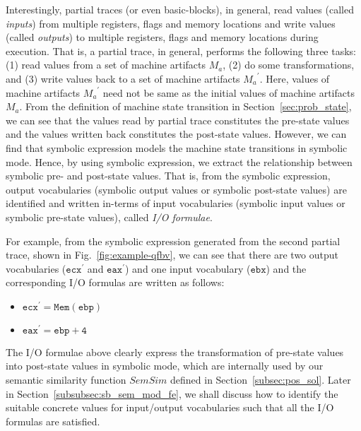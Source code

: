 Interestingly, partial traces (or even basic-blocks), in general, read values (called \emph{inputs}) from multiple registers, flags and memory locations and write values (called \emph{outputs}) to multiple registers, flags and memory locations during execution. That is, a partial trace, in general, performs the following three tasks: (1) read values from a set of machine artifacts $M_a$, (2) do some transformations, and (3) write values back to a set of machine artifacts ${M_a}^\prime$. Here, values of machine artifacts ${M_a}^\prime$ need not be same as the initial values of machine artifacts ${M_a}$. From the definition of machine state transition in Section~\ref{sec:prob_state}, we can see that the values read by partial trace constitutes the pre-state values and the values written back constitutes the post-state values. However,
we can find that symbolic expression models the machine state transitions in symbolic mode.
Hence, by using symbolic expression, we extract the relationship between symbolic pre- and post-state values. That is, from the symbolic expression, output vocabularies (symbolic output values or symbolic post-state values) are identified and written in-terms of input vocabularies (symbolic input values or symbolic pre-state values), called \emph{I/O formulae}.

For example, from the symbolic expression generated from the second partial trace, shown in Fig.~\ref{fig:example-qfbv}, we can see that there are two output vocabularies ($\mathtt{ecx^\prime}$ and $\mathtt{eax^\prime}$) and one input vocabulary ($\mathtt{ebx}$) and the corresponding I/O formulas are written as follows:
\begin{itemize}
\centering
\itemsep-0.1em
 \item[] $\mathtt{ecx^\prime = Mem(ebp)}$
  \item[] $\mathtt{eax^\prime = ebp + 4} $
\end{itemize}
The I/O formulae above clearly express the transformation of pre-state values into post-state values in symbolic mode, which  are internally used by our semantic similarity function $SemSim$ defined in Section~\ref{subsec:pos_sol}. Later in Section~\ref{subsubsec:sb_sem_mod_fe}, we shall discuss how to identify the suitable concrete values for input/output vocabularies such that all the I/O formulas are satisfied.

